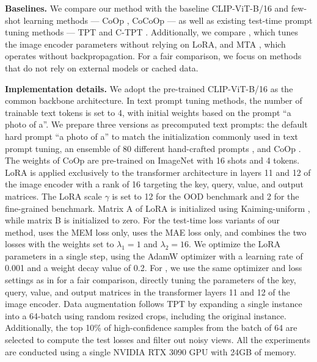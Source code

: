 \noindent\textbf{Baselines.}\hspace{5mm}
We compare our method with the baseline CLIP-ViT-B/16 and few-shot learning methods — CoOp \citep{zhou2022learning}, CoCoOp \citep{zhou2022conditional} — as well as existing test-time prompt tuning methods — TPT \citep{shu2022test} and C-TPT \citep{yoon2024c}.
Additionally, we compare \nameie, which tunes the image encoder parameters without relying on LoRA, and MTA \citep{zanella2024test}, which operates without backpropagation.
For a fair comparison, we focus on methods that do not rely on external models or cached data.
\newline

\noindent\textbf{Implementation details.}\hspace{5mm}
We adopt the pre-trained CLIP-ViT-B/16 as the common backbone architecture.
In text prompt tuning methods, the number of trainable text tokens is set to 4, with initial weights based on the prompt ``a photo of a''.
We prepare three versions as precomputed text prompts: the default hard prompt ``a photo of a'' to match the initialization commonly used in text prompt tuning, an ensemble of 80 different hand-crafted prompts \cite{radford2021learning}, and CoOp \citep{zhou2022learning}.
The weights of CoOp are pre-trained on ImageNet with 16 shots and 4 tokens.
LoRA is applied exclusively to the transformer architecture in layers 11 and 12 of the image encoder with a rank of 16 targeting the key, query, value, and output matrices.
The LoRA scale $\gamma$ is set to 12 for the OOD benchmark and 2 for the fine-grained benchmark.
Matrix A of LoRA is initialized using Kaiming-uniform \citep{he2015delving}, while matrix B is initialized to zero.
For the test-time loss variants of our method, \textbf{\namemem} uses the MEM loss only, \textbf{\namemae} uses the MAE loss only, and \textbf{\name} combines the two losses with the weights set to $\lambda_1 = 1$ and $\lambda_2 = 16$.
We optimize the LoRA parameters in a single step, using the AdamW optimizer \citep{loshchilov2017decoupled} with a learning rate of 0.001 and a weight decay value of 0.2.
For \nameie, we use the same optimizer and loss settings as in \textbf{\name} for a fair comparison, directly tuning the parameters of the key, query, value, and output matrices in the transformer layers 11 and 12 of the image encoder.
Data augmentation follows TPT by expanding a single instance into a 64-batch using random resized crops, including the original instance.
Additionally, the top 10\% of high-confidence samples from the batch of 64 are selected to compute the test losses and filter out noisy views.
All the experiments are conducted using a single NVIDIA RTX 3090 GPU with 24GB of memory.


